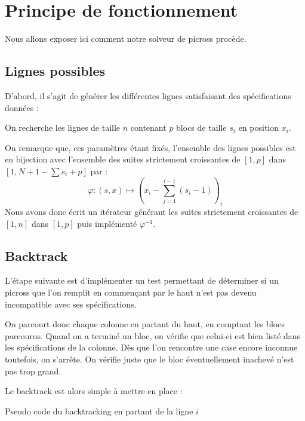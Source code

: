 \section{Principe de fonctionnement}
Nous allons exposer ici comment notre solveur de picross procède.
\subsection{Lignes possibles}

D'abord, il s'agit de générer les différentes lignes satisfaisant des spécifications données : 

\begin{nonogram}[rows=3,columns=6,extracells=2]
\end{nonogram}

On recherche les lignes de taille $n$ contenant $p$ blocs de taille $s_i$ en position $x_i$.

On remarque que, ces paramètres étant fixés, l'ensemble des lignes possibles est en bijection avec l'ensemble des suites strictement croissantes de $[1, p]$ dans $[1, N+1-\sum s_i +p]$ par :
\[ \varphi : (s, x) \mapsto \left(x_i -\sum_{j=1}^{i-1} (s_i-1)\right)_i \]
Nous avons donc écrit un itérateur générant les suites strictement croissantes de $[1, n]$ dans $[1, p]$ puis implémenté $\varphi^{-1}$.

\subsection{Backtrack}

L'étape suivante est d'implémenter un test permettant de déterminer si un picross que l'on remplit en commençant par le haut n'est pas devenu incompatible avec ses spécifications.

On parcourt donc chaque colonne en partant du haut, en comptant les blocs parcourus. Quand on a terminé un bloc, on vérifie que celui-ci est bien listé dans les spécifications de la colonne. Dès que l'on rencontre une case encore inconnue toutefois, on s'arrête. On vérifie juste que le bloc éventuellement inachevé n'est pas trop grand.

Le backtrack est alors simple à mettre en place :

\begin{algorithm}[H]
 \caption{Pseudo code du backtracking en partant de la ligne $i$}
\end{algorithm}

